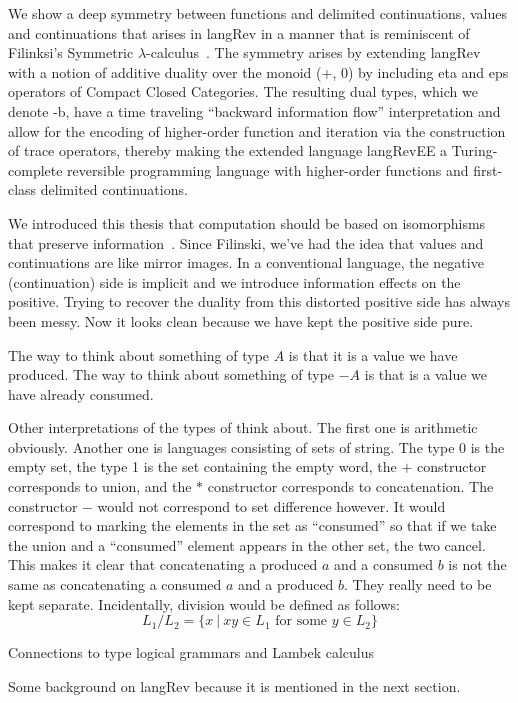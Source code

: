 \documentclass[preprint]{sigplanconf}
\newcommand{\lcal}{\ensuremath{\lambda}-calculus}
\begin{document}
We show a deep symmetry between functions and delimited continuations, values
and continuations that arises in {{langRev}} in a manner that is reminiscent
of Filinksi's Symmetric \lcal ~\cite{Filinski:1989:DCI:648332.755574}. The
symmetry arises by extending {{langRev}} with a notion of additive duality
over the monoid {{(+, 0)}} by including {{eta}} and {{eps}} operators of
Compact Closed Categories. The resulting dual types, which we denote {{-b}},
have a time traveling ``backward information flow'' interpretation and allow
for the encoding of higher-order function and iteration via the construction
of trace operators, thereby making the extended language {{langRevEE}} a
Turing-complete reversible programming language with higher-order functions
and first-class delimited continuations.

We introduced this thesis that computation should be based on isomorphisms
that preserve information~\cite{infeffects}. Since Filinski, we've had the
idea that values and continuations are like mirror images. In a conventional
language, the negative (continuation) side is implicit and we introduce
information effects on the positive. Trying to recover the duality from this
distorted positive side has always been messy. Now it looks clean because we
have kept the positive side pure.

The way to think about something of type $A$ is that it is a value we have
produced. The way to think about something of type $-A$ is that is a value we
have already consumed. 

Other interpretations of the types of think about. The first one is
arithmetic obviously. Another one is languages consisting of sets of
string. The type 0 is the empty set, the type 1 is the set containing the
empty word, the $+$ constructor corresponds to union, and the $*$ constructor
corresponds to concatenation. The constructor $-$ would not correspond to set
difference however. It would correspond to marking the elements in the set as
``consumed'' so that if we take the union and a ``consumed'' element appears
in the other set, the two cancel. This makes it clear that concatenating a
produced $a$ and a consumed $b$ is not the same as concatenating a consumed
$a$ and a produced $b$. They really need to be kept separate. Incidentally,
division would be defined as follows:
\[
L_1 / L_2 = \{ x ~|~ xy \in L_1 \mbox{~for~some~} y \in L_2 \}
\]

Connections to type logical grammars and Lambek calculus

Some background on {{langRev}} because it is mentioned in the next section.
\end{document}
